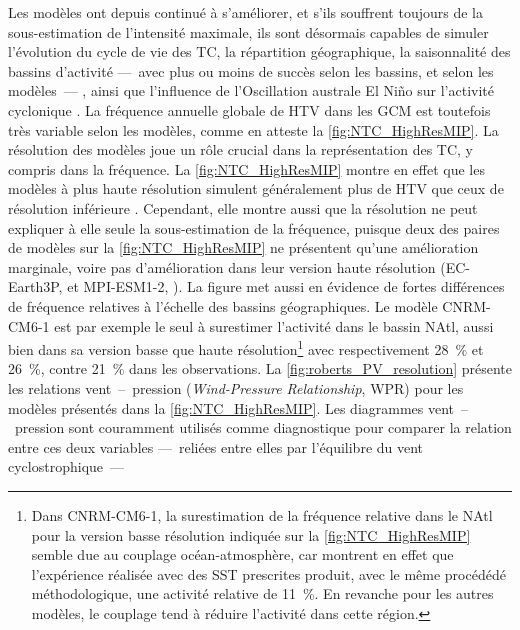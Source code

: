 \documentclass[../main.tex]{subfiles}
\begin{document}
Les modèles ont depuis continué à s'améliorer, et s'ils souffrent toujours de la sous-estimation de l'intensité maximale, ils sont désormais capables de simuler
l'évolution du cycle de vie des TC, la répartition géographique, la saisonnalité des bassins d'activité ---~avec plus ou moins de succès selon les bassins, et
selon les modèles~--- \parencite{bengtsson_tropical_2007,zhao_simulations_2009,shaevitz_characteristics_2014}, ainsi que l'influence de l'Oscillation australe
El Niño sur l'activité cyclonique \parencite{vitart_simulation_1997,gualdi_changes_2008,camargo_experimental_2009}. La fréquence annuelle globale de HTV dans
les GCM est toutefois très variable selon les modèles, comme en atteste la \cref{fig:NTC_HighResMIP}. La résolution des modèles joue un rôle crucial dans la
représentation des TC, y compris dans la fréquence. La \cref{fig:NTC_HighResMIP} montre en effet que les modèles à plus haute résolution simulent généralement
plus de HTV que ceux de résolution inférieure \parencite{camargo_global_2013,roberts_impact_2020}. Cependant, elle montre aussi que la résolution ne peut
expliquer à elle seule la sous-estimation de la fréquence, puisque deux des paires de modèles sur la \cref{fig:NTC_HighResMIP} ne présentent qu'une amélioration
marginale, voire pas d'amélioration dans leur version haute résolution (EC-Earth3P, \cite{haarsma_highresmip_2020} et MPI-ESM1-2, \cite{gutjahr_max_2019}). La
figure met aussi en évidence de fortes différences de fréquence relatives à l'échelle des bassins géographiques. Le modèle CNRM-CM6-1 est par exemple le seul à
surestimer l'activité dans le bassin NAtl, aussi bien dans sa version basse que haute résolution\footnote{Dans CNRM-CM6-1, la surestimation de la fréquence
relative dans le NAtl pour la version basse résolution indiquée sur la \cref{fig:NTC_HighResMIP} semble due au couplage océan-atmosphère, car
\textcite{roberts_impact_2020} montrent en effet que l'expérience réalisée avec des SST prescrites produit, avec le même procédédé méthodologique, une activité
relative de \SI{11}{\percent}. En revanche pour les autres modèles, le couplage tend à réduire l'activité dans cette région.} avec respectivement
\SI{28}{\percent} et \SI{26}{\percent}, contre \SI{21}{\percent} dans les observations. La \cref{fig:roberts_PV_resolution} présente les relations
vent~--~pression (\textit{Wind-Pressure Relationship}, WPR) pour les modèles présentés dans la \cref{fig:NTC_HighResMIP}. Les diagrammes vent~--~pression sont
couramment utilisés comme diagnostique pour comparer la relation entre ces deux variables ---~reliées entre elles par l'équilibre du vent cyclostrophique~---
\end{document}
